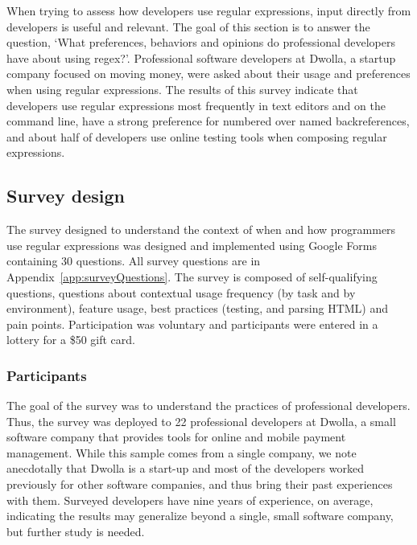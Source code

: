 When trying to assess how developers use regular expressions, input directly from developers is useful and relevant.  The goal of this section is to answer the question, `What preferences, behaviors and opinions do professional developers have about using regex?'.  Professional software developers at Dwolla, a startup company focused on moving money, were asked about their usage and preferences when using regular expressions.  The results of this survey indicate that developers use regular expressions most frequently in text editors and on the command line, have a strong preference for numbered over named backreferences, and about half of developers use online testing tools when composing regular expressions.

\subsection{Survey design}

The survey designed to understand the context of when and how programmers use regular expressions was designed and implemented using Google Forms containing 30 questions.  All survey questions are in Appendix~\ref{app:surveyQuestions}. The survey is composed of self-qualifying questions, questions about contextual usage frequency (by task and by environment), feature usage, best practices (testing, and parsing HTML) and pain points.  Participation was voluntary and participants were entered in a lottery for a \$50 gift card.


\subsubsection{Participants}
The goal of the survey was to understand the practices of professional developers. Thus, the survey was deployed to 22 professional developers at Dwolla, a small software company that provides tools for online and mobile payment management. While this sample comes from a single company, we note anecdotally that Dwolla is a start-up and most of the developers worked previously for other software companies, and thus bring their past experiences with them. Surveyed developers have nine years of experience, on average, indicating the results may generalize beyond a single, small software company, but further study is needed.

